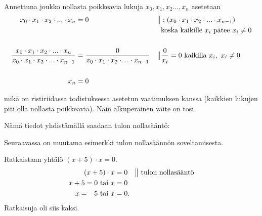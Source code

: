 \begin{todistus}
Annettuna joukko nollasta poikkeavia lukuja $x_0, x_1, x_2 ... , x_n$ asetetaan
\begin{align*}
    x_0 \cdot x_1 \cdot x_2 \cdot ... \cdot x_n &= 0 & \big\| & : (x_0 \cdot x_1 \cdot x_2 \cdot ... \cdot x_{n-1}) \\
    & & & \text{koska kaikille $x_i$ pätee $x_i \neq 0$} \\
    \\
    \frac{x_0 \cdot x_1 \cdot x_2 \cdot ... \cdot x_n}{x_0 \cdot x_1 \cdot x_2 \cdot ... \cdot x_{n-1}} &=
    \frac{0}{x_0 \cdot x_1 \cdot x_2 \cdot ... \cdot x_{n-1}} & \big\| & \frac{0}{x_i} = 0\ \text{kaikilla $x_i,\ x_i \neq 0$} \\
    \\
    x_n &= 0 & &
\end{align*}

mikä on ristiriidassa todistuksessa asetetun vaatimuksen kanssa (kaikkien
lukujen piti olla nollasta poikkeavia). Näin alkuperäinen väite on tosi.
\end{todistus}

Nämä tiedot yhdistämällä saadaan tulon nollasääntö:



Seuraavassa on muutama esimerkki tulon nollasäännön soveltamisesta.

\begin{esimerkki} Ratkaistaan yhtälö $(x+5) \cdot x =0 $.
    \begin{align*}
        (x+5)\cdot x &=0 \quad \big\| \text{ tulon nollasääntö} \\
        x +5= 0 \text{ tai } x &=0 \\
        x= -5 \text{ tai } x &=0.
    \end{align*}
    Ratkaisuja oli siis kaksi.
\end{esimerkki}

